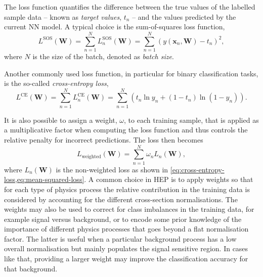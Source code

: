 The loss function quantifies the difference between the true values of the labelled sample data -- known as \emph{target values}, $t_n$ -- and the values predicted by the current NN model. A typical choice is the sum-of-squares loss function,
\begin{equation}
    \label{eq:mean-squared-loss}
   L^{\text{SOS}}(\mathbf{W}) = \sum _{n=1}^{N}L_n^{\text{SOS}}(\mathbf{W})= \sum _{n=1}^{N}\left( y(\mathbf{x}_n, \mathbf{W})-t_n \right)^{2},
\end{equation}
where $N$ is the size of the batch, denoted as \emph{batch size}. 

Another commonly used loss function, in particular for binary classification tasks, is the so-called \emph{cross-entropy loss},
\begin{equation}
    \label{eq:cross-entropy-loss}
    L^{\text{CE}}(\mathbf{W}) = \sum _{n=1}^{N}L_n^{\text{CE}}(\mathbf{W}) = \sum _{n=1}^{N}\left( t_n \ln y_n + ( 1 - t_n) \ln (1 - y_n) \right).
\end{equation}

It is also possible to assign a weight, $\omega$, to each training sample, that is applied as a multiplicative factor when computing the loss function and thus controls the relative penalty for incorrect predictions. The loss then becomes
\begin{equation}
    L_{\text{weighted}}(\mathbf{W}) = \sum _{n=1}^{N} \omega_n L_n(\mathbf{W}), 
\end{equation}
where $L_n(\mathbf{W})$ is the non-weighted loss as shown in \cref{eq:cross-entropy-loss,eq:mean-squared-loss}. 
A common choice in HEP is to apply weights so that for each type of physics process the relative contribution in the training data is considered by accounting for the different cross-section normalisations.
The weights may also be used to correct for class imbalances in the training data, for example signal versus background, or to encode some prior knowledge of the importance of different physics processes that goes beyond a flat normalisation factor. The latter is useful when a particular background process has a low overall normalisation but mainly populates the signal sensitive region. In cases like that, providing a larger weight may improve the classification accuracy for that background. 


